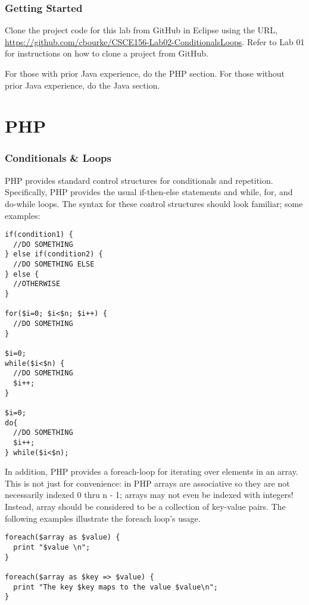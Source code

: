 \documentclass[12pt]{scrartcl}
\begin{document}


\section*{Getting Started}

Clone the project code for this lab from GitHub in Eclipse using the
URL, \url{https://github.com/cbourke/CSCE156-Lab02-ConditionalsLoops}.
Refer to Lab 01 for instructions on how to clone a project from GitHub.

For those with prior Java experience, do the PHP section.  For those
without prior Java experience, do the Java section.

\part*{PHP}

\section*{Conditionals \& Loops}

PHP provides standard control structures for conditionals and repetition.  Specifically, PHP provides the usual if-then-else statements and while, for, and do-while loops.  The syntax for these control structures should look familiar; some examples:

\begin{verbatim}
if(condition1) {
  //DO SOMETHING
} else if(condition2) {
  //DO SOMETHING ELSE
} else {
  //OTHERWISE
}

for($i=0; $i<$n; $i++) {
  //DO SOMETHING
}

$i=0;
while($i<$n) {
  //DO SOMETHING
  $i++;
}

$i=0;
do{ 
  //DO SOMETHING
  $i++;
} while($i<$n);
\end{verbatim}

In addition, PHP provides a foreach-loop for iterating over elements in 
an array.  This is not just for convenience: in PHP arrays are associative 
so they are not necessarily indexed 0 thru n - 1; arrays may not even 
be indexed with integers!  Instead, array should be considered to be a
collection of key-value pairs.  The following examples illustrate the 
foreach loop's usage.

\begin{verbatim}
foreach($array as $value) {
  print "$value \n";
}

foreach($array as $key => $value) {
  print "The key $key maps to the value $value\n";
}
\end{verbatim}
\end{document}

